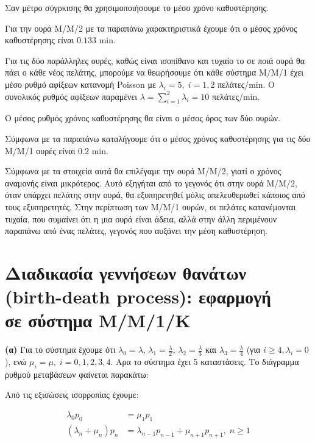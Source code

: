 \documentclass {article}
\newcommand{\english}[1]{\foreignlanguage{english}{#1}}
\begin{document}
Σαν μέτρο σύγρκισης θα χρησιμοποιήσουμε το μέσο χρόνο καθυστέρησης.

Για την ουρά Μ/Μ/2 με τα παραπάνω χαρακτηριστικά έχουμε ότι ο μέσος χρόνος καθυστέρησης είναι $0.133$ \foreignlanguage{english}{min}.

Για τις δύο παράλληλες ουρές, καθώς είναι ισοπίθανο και τυχαίο το σε ποιά ουρά θα πάει ο κάθε νέος πελάτης, μπορούμε να θεωρήσουμε ότι κάθε σύστημα Μ/Μ/1 έχει μέσο ρυθμό αφίξεων κατανομή \foreignlanguage{english}{Poisson} με $λ_i = 5,\;i = 1, 2$ πελάτες/\foreignlanguage{english}{min}. Ο συνολικός ρυθμός αφίξεων παραμένει $λ = \sum_{i=1}^{2}{λ_i} = 10$ πελάτες/\english{min}.

O μέσος ρυθμός χρόνος καθυστέρησης θα είναι ο μέσος όρος των δύο ουρών.

Σύμφωνα με τα παραπάνω καταλήγουμε ότι ο μέσος χρόνος καθυστέρησης για τις δύο Μ/Μ/1 ουρές είναι $0.2$ \english{min}.

Σύμφωνα με τα στοιχεία αυτά θα επιλέγαμε την ουρά Μ/Μ/2, γιατί ο χρόνος αναμονής είναι μικρότερος. Αυτό εξηγήται από το γεγονός ότι στην ουρά Μ/Μ/2, όταν υπάρχει πελάτης στην ουρά, θα εξυπηρετηθεί μόλις απελευθερωθεί κάποιος από τους εξυπηρετητές. Στην περίπτωση των Μ/Μ/1 ουρών, οι πελάτες κατανέμονται τυχαία, που συμαίνει ότι η μια ουρά είναι άδεια, αλλά στην άλλη περιμένουν παραπάνω από ένας πελάτες, γεγονός που αυξάνει την μέση καθυστέρηση.

\section*{Διαδικασία γεννήσεων θανάτων \\
(\english{birth-death process}): εφαρμογή\\
σε σύστημα Μ/Μ/1/Κ}

\textbf{(α)} Για το σύστημα έχουμε ότι $λ_0 = λ$, $λ_1 = \frac{λ}{2}$, $λ_2 = \frac{λ}{3}$ και $λ_3 = \frac{λ}{4}$ (για $i \geq 4, λ_i = 0$), ενώ $μ_i = μ,\; i = 0, 1, 2, 3, 4$. Αρα το σύστημα έχει 5 καταστάσεις. Το διάγραμμα ρυθμού μεταβάσεων φαίνεται παρακάτω:



Από τις εξισώσεις ισορροπίας έχουμε: 

\begin{equation}\label{eq:14}
	\begin{split}
		λ_0p_0 & = μ_1p_1\\
		(λ_n + μ_n)p_n & = λ_{n-1}p_{n-1} + μ_{n+1}p_{n+1},\; n \geq 1
	\end{split}
\end{equation}
\end{document}
